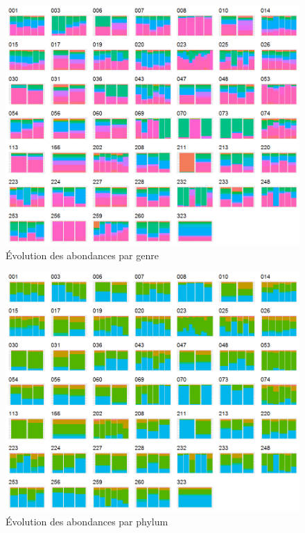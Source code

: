 \documentclass[12pt,a4paper]{article}
\begin{document}
\begin{figure}
\begin{center}
\includegraphics[scale=0.70]{img/enfin_barplot_genus_norm.png}\hfill
\end{center}
\caption{Évolution des abondances par genre}
\label{plotabundancegenre}
\end{figure}

\begin{figure}
\begin{center}
\includegraphics[scale=0.70]{img/enfin_barplot_phylum_norm.png}\hfill
\end{center}
\caption{Évolution des abondances par phylum}
\label{plotabundancephylum}
\end{figure}
\end{document}
